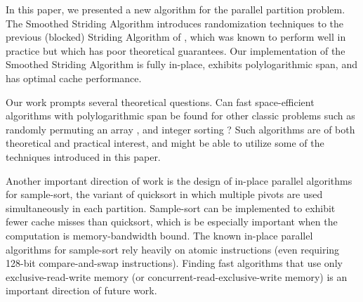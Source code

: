 \documentclass[11pt]{article}
\theoremstyle{remark}
\theoremstyle{remark}
\begin{document}
In this paper, we presented a new algorithm for the parallel partition problem.
The Smoothed Striding Algorithm introduces randomization techniques to the
previous (blocked) Striding Algorithm of \cite{Frias08, FrancisPa92},
which was known to perform well in practice but which has poor theoretical guarantees. 
Our implementation of the
Smoothed Striding Algorithm is fully in-place, exhibits
polylogarithmic span, and has optimal cache performance.

Our work prompts several theoretical questions. Can fast
space-efficient algorithms with polylogarithmic span be found for
other classic problems such as randomly permuting an array
\cite{Anderson90, AlonsoSc96, ShunGu15}, and integer sorting
\cite{Rajasekaran92, HanHe12, AlbersHa97, Han01, GerbessiotisSi04}?
Such algorithms are of both theoretical and practical interest, and
might be able to utilize some of the techniques introduced in this
paper.

Another important direction of work is the design of in-place parallel
algorithms for sample-sort, the variant of quicksort in which multiple
pivots are used simultaneously in each partition. Sample-sort can be
implemented to exhibit fewer cache misses than quicksort, which is be
especially important when the computation is memory-bandwidth
bound. The known in-place parallel algorithms for sample-sort rely
heavily on atomic instructions \cite{AxtmannWi17} (even requiring
128-bit compare-and-swap instructions). Finding fast algorithms that
use only exclusive-read-write memory (or
concurrent-read-exclusive-write memory) is an important direction of
future work.



\end{document}
